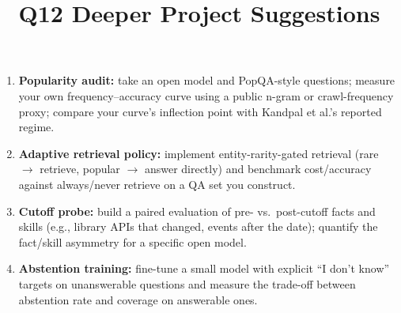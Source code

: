 \documentclass[11pt]{article}
\title{Q12 Deeper Project Suggestions}
\date{}
\begin{document}
\maketitle
\begin{enumerate}[noitemsep]
\item \textbf{Popularity audit:} take an open model and PopQA-style questions; measure your own frequency--accuracy curve using a public n-gram or crawl-frequency proxy; compare your curve's inflection point with Kandpal et al.'s reported regime.
\item \textbf{Adaptive retrieval policy:} implement entity-rarity-gated retrieval (rare $\to$ retrieve, popular $\to$ answer directly) and benchmark cost/accuracy against always/never retrieve on a QA set you construct.
\item \textbf{Cutoff probe:} build a paired evaluation of pre- vs.\ post-cutoff facts and skills (e.g., library APIs that changed, events after the date); quantify the fact/skill asymmetry for a specific open model.
\item \textbf{Abstention training:} fine-tune a small model with explicit ``I don't know'' targets on unanswerable questions and measure the trade-off between abstention rate and coverage on answerable ones.
\end{enumerate}
\end{document}
